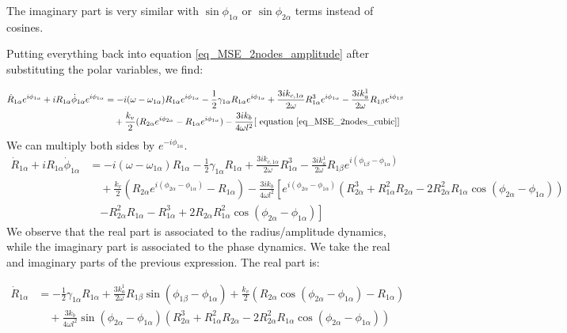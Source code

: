 \documentclass[11pt, a4paper]{article} %
\begin{document}
\begin{appendices}
The imaginary part is very similar with $\sin\phi_{1\alpha}$ or $\sin\phi_{2\alpha}$ terms instead of cosines.

Putting everything back into equation \eqref{eq_MSE_2nodes_amplitude} after substituting the polar variables, we find:

\begin{equation}
\begin{aligned}
\dot{R}_{1\alpha} e^{i\phi_{1\alpha}} + i R_{1\alpha} \dot{\phi}_{1\alpha} e^{i\phi_{1\alpha}} &= 
-i(\omega - \omega_{1\alpha}) R_{1\alpha} e^{i\phi_{1\alpha}} - \frac{1}{2} \gamma_{1\alpha} R_{1\alpha} e^{i\phi_{1\alpha}} 
 + \frac{3ik_{c,1\alpha}}{2\omega} R_{1\alpha}^3 e^{i\phi_{1\alpha}} - \frac{3ik_a^{1}}{2\omega} R_{1\beta} e^{i\phi_{1\beta}} \\
&\quad + \frac{k_v}{2} (R_{2\alpha}e^{i\phi_{2\alpha}} - R_{1\alpha}e^{i\phi_{1\alpha}}) 
- \frac{3ik_b}{4\omega l^2} [\text{ equation \eqref{eq_MSE_2nodes_cubic}}]
\end{aligned}
\end{equation}
We can multiply both sides by $e^{-i\phi_{1\alpha}}$. 
\begin{equation}
\begin{aligned}
\dot{R}_{1\alpha} + i R_{1\alpha} \dot{\phi}_{1\alpha} &= 
-i(\omega - \omega_{1\alpha}) R_{1\alpha} - \frac{1}{2} \gamma_{1\alpha} R_{1\alpha} 
+ \frac{3ik_{c,1\alpha}}{2\omega} R_{1\alpha}^3 - \frac{3ik_a^{1}}{2\omega} R_{1\beta} e^{i(\phi_{1\beta} - \phi_{1\alpha})} \\
&\quad + \frac{k_v}{2} (R_{2\alpha}e^{i(\phi_{2\alpha}-\phi_{1\alpha})} - R_{1\alpha}) 
- \frac{3ik_b}{4\omega l^2} \left[ e^{i(\phi_{2\alpha} - \phi_{1\alpha})} 
\left( R_{2\alpha}^3 + R_{1\alpha}^2 R_{2\alpha} - 2R_{2\alpha}^2 R_{1\alpha} \cos(\phi_{2\alpha} - \phi_{1\alpha}) \right) \right. \\
&\quad \left. - R_{2\alpha}^2 R_{1\alpha} - R_{1\alpha}^3 + 2R_{2\alpha} R_{1\alpha}^2 \cos(\phi_{2\alpha} - \phi_{1\alpha}) \right]
\end{aligned}
\end{equation}
We observe that the real part is associated to 
the radius/amplitude dynamics, while the imaginary part is associated to the phase dynamics.
We take the real and imaginary parts of the previous expression. The real part is:

\begin{equation}
\begin{aligned}
\dot{R}_{1\alpha} &= -\frac{1}{2} \gamma_{1\alpha} R_{1\alpha} 
+ \frac{3k_a^{1}}{2\omega} R_{1\beta} \sin(\phi_{1\beta} - \phi_{1\alpha}) 
+ \frac{k_v}{2} (R_{2\alpha}\cos{(\phi_{2\alpha} - \phi_{1\alpha})} - R_{1\alpha}) \\
&\quad + \frac{3k_b}{4\omega l^2} \sin(\phi_{2\alpha} - \phi_{1\alpha}) 
\left( R_{2\alpha}^3 + R_{1\alpha}^2 R_{2\alpha} - 2R_{2\alpha}^2 R_{1\alpha} \cos(\phi_{2\alpha} - \phi_{1\alpha}) \right)
\end{aligned}
\end{equation}


\end{appendices}
\end{document}
